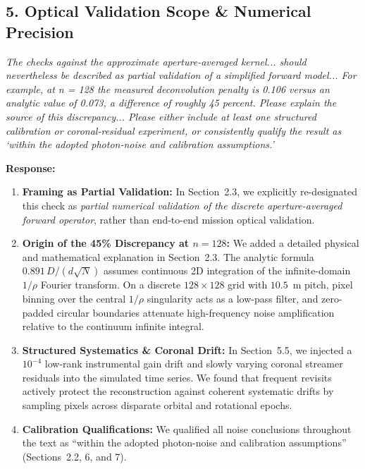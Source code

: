 \documentclass[11pt]{article}
\begin{document}
\subsection*{5. Optical Validation Scope \& Numerical Precision}

\begin{refcomment}
\textit{The checks against the approximate aperture-averaged kernel... should nevertheless be described as partial validation of a simplified forward model... For example, at n = 128 the measured deconvolution penalty is 0.106 versus an analytic value of 0.073, a difference of roughly 45 percent. Please explain the source of this discrepancy... Please either include at least one structured calibration or coronal-residual experiment, or consistently qualify the result as `within the adopted photon-noise and calibration assumptions.'}
\end{refcomment}

\textbf{Response:}\\[1mm]
\begin{enumerate}
\item \textbf{Framing as Partial Validation:} In Section~2.3, we explicitly re-designated this check as \textit{partial numerical validation of the discrete aperture-averaged forward operator}, rather than end-to-end mission optical validation.
\item \textbf{Origin of the 45\% Discrepancy at $n=128$:} We added a detailed physical and mathematical explanation in Section~2.3. The analytic formula $0.891\,D/(d\sqrt{N})$ assumes continuous 2D integration of the infinite-domain $1/\rho$ Fourier transform. On a discrete $128\times128$ grid with $10.5$~m pitch, pixel binning over the central $1/\rho$ singularity acts as a low-pass filter, and zero-padded circular boundaries attenuate high-frequency noise amplification relative to the continuum infinite integral.
\item \textbf{Structured Systematics \& Coronal Drift:} In Section~5.5, we injected a $10^{-4}$ low-rank instrumental gain drift and slowly varying coronal streamer residuals into the simulated time series. We found that frequent revisits actively protect the reconstruction against coherent systematic drifts by sampling pixels across disparate orbital and rotational epochs.
\item \textbf{Calibration Qualifications:} We qualified all noise conclusions throughout the text as ``within the adopted photon-noise and calibration assumptions'' (Sections~2.2, 6, and 7).
\end{enumerate}
\end{document}
